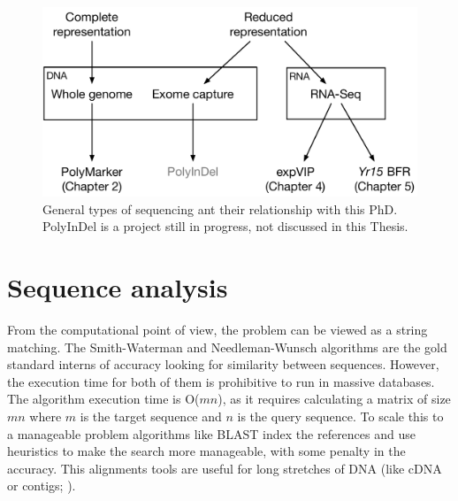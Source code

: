 \begin{figure}
\includegraphics[width=1\textwidth]{LitReview/Figures/typesOfSequencing.pdf}
\caption{General types of sequencing ant their relationship with this PhD. PolyInDel is a project still in progress, not discussed in this Thesis. }
\label{fig:lit:reducedRepresentation}
\end{figure}


\section{Sequence analysis}


From the computational point of view, the problem can be viewed as a string matching. The Smith-Waterman \citep{Smith1981} and Needleman-Wunsch \citep{Needleman1970} algorithms are the gold standard interns of accuracy looking for similarity between sequences. However, the execution time for both of them is prohibitive to run in massive databases. The algorithm execution time is O($mn$), as it requires calculating a matrix of size $mn$ where $m$ is the target sequence and $n$ is the query sequence.  To scale this to a manageable problem algorithms like BLAST index the references and use heuristics to make the search more manageable, with some penalty in the accuracy. This alignments tools are useful for long stretches of DNA (like cDNA or contigs; \citealt{Altschul1990}).

